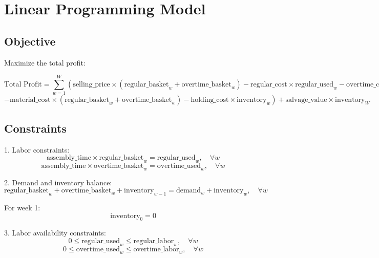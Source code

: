 \documentclass{article}
\begin{document}
\section*{Linear Programming Model}

\subsection*{Objective}
Maximize the total profit:

\[
\text{Total Profit} = \sum_{w=1}^{W} \left( \text{selling\_price} \times (\text{regular\_basket}_w + \text{overtime\_basket}_w) - \text{regular\_cost} \times \text{regular\_used}_w - \text{overtime\_cost} \times \text{overtime\_used}_w \right.
\]
\[
\left. - \text{material\_cost} \times (\text{regular\_basket}_w + \text{overtime\_basket}_w) - \text{holding\_cost} \times \text{inventory}_w \right) + \text{salvage\_value} \times \text{inventory}_W
\]

\subsection*{Constraints}

1. Labor constraints:
\[
\text{assembly\_time} \times \text{regular\_basket}_w = \text{regular\_used}_w, \quad \forall w
\]
\[
\text{assembly\_time} \times \text{overtime\_basket}_w = \text{overtime\_used}_w, \quad \forall w
\]

2. Demand and inventory balance:
\[
\text{regular\_basket}_w + \text{overtime\_basket}_w + \text{inventory}_{w-1} = \text{demand}_w + \text{inventory}_w, \quad \forall w
\]

For week 1:
\[
\text{inventory}_0 = 0
\]

3. Labor availability constraints:
\[
0 \leq \text{regular\_used}_w \leq \text{regular\_labor}_w, \quad \forall w
\]
\[
0 \leq \text{overtime\_used}_w \leq \text{overtime\_labor}_w, \quad \forall w
\]
\end{document}
